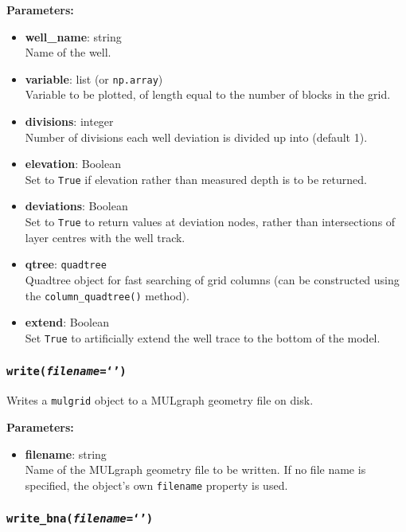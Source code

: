 \textbf{Parameters:}
\begin{itemize}
\item \textbf{well\_name}: string\\
  Name of the well.
\item \textbf{variable}: list (or \texttt{np.array})\\
  Variable to be plotted, of length equal to the number of blocks in the grid.
\item \textbf{divisions}: integer\\
  Number of divisions each well deviation is divided up into (default 1).
\item \textbf{elevation}: Boolean\\
  Set to \texttt{True} if elevation rather than measured depth is to be returned.
\item \textbf{deviations}: Boolean\\
  Set to \texttt{True} to return values at deviation nodes, rather than intersections of layer centres with the well track.
\item \textbf{qtree}: \texttt{quadtree}\\
  Quadtree object for fast searching of grid columns (can be constructed using the \texttt{column\_quadtree()} method).
\item \textbf{extend}: Boolean\\
  Set \texttt{True} to artificially extend the well trace to the bottom of the model.
\end{itemize}

\subsubsection{\texttt{write(\emph{filename}=`')}}

Writes a \texttt{mulgrid} object to a MULgraph geometry file on disk.

\textbf{Parameters:}
\begin{itemize}
\item \textbf{filename}: string\\
  Name of the MULgraph geometry file to be written.  If no file name is specified, the object's own \texttt{filename} property is used.
\end{itemize}

\subsubsection{\texttt{write\_bna(\emph{filename}=`')}}

